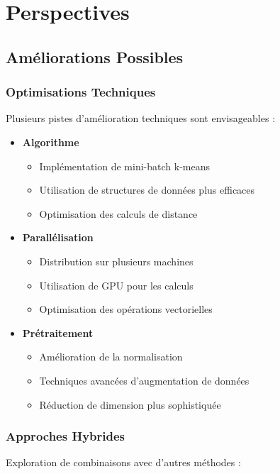 \chapter{Perspectives}

\section{Améliorations Possibles}

\subsection{Optimisations Techniques}
Plusieurs pistes d'amélioration techniques sont envisageables :

\begin{itemize}
    \item \textbf{Algorithme}
    \begin{itemize}
        \item Implémentation de mini-batch k-means
        \item Utilisation de structures de données plus efficaces
        \item Optimisation des calculs de distance
    \end{itemize}

    \item \textbf{Parallélisation}
    \begin{itemize}
        \item Distribution sur plusieurs machines
        \item Utilisation de GPU pour les calculs
        \item Optimisation des opérations vectorielles
    \end{itemize}

    \item \textbf{Prétraitement}
    \begin{itemize}
        \item Amélioration de la normalisation
        \item Techniques avancées d'augmentation de données
        \item Réduction de dimension plus sophistiquée
    \end{itemize}
\end{itemize}

\subsection{Approches Hybrides}
Exploration de combinaisons avec d'autres méthodes :

